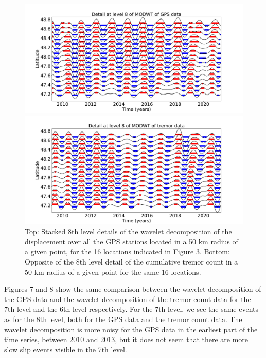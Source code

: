 \documentclass[draft]{agujournal2018}
\begin{document}
\begin{figure}
\noindent\includegraphics[width=\textwidth, trim={0cm 0cm 0cm 0cm},clip]{figures/GPS_detail_8.pdf}

\noindent\includegraphics[width=\textwidth, trim={0cm 0cm 0cm 0cm},clip]{figures/tremor_detail_8.pdf}
\caption{Top: Stacked 8th level details of the wavelet decomposition of the displacement over all the GPS stations located in a 50 km radius of a given point, for the 16 locations indicated in Figure 3. Bottom: Opposite of the 8th level detail of the cumulative tremor count in a 50 km radius of a given point for the same 16 locations.}
\label{pngfiguresample}
\end{figure}

Figures 7 and 8 show the same comparison between the wavelet decomposition of the GPS data and the wavelet decomposition of the tremor count data for the 7th level and the 6th level respectively. For the 7th level, we see the same events as for the 8th level, both for the GPS data and the tremor count data. The wavelet decomposition is more noisy for the GPS data in the earliest part of the time series, between 2010 and 2013, but it does not seem that there are more slow slip events visible in the 7th level. \\
\end{document}
